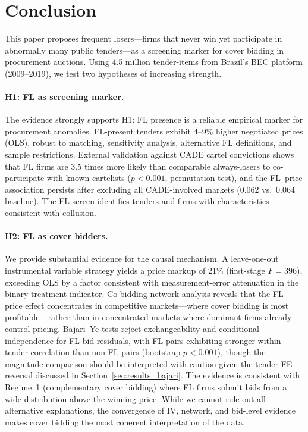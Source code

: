 \section{Conclusion}
\label{sec:conclusion}

This paper proposes frequent losers---firms that never win yet
participate in abnormally many public tenders---as a screening marker for
cover bidding in procurement auctions. Using 4.5 million tender-items
from Brazil's BEC platform (2009--2019), we test two hypotheses of
increasing strength.

\paragraph{H1: FL as screening marker.}
The evidence strongly supports H1: FL presence is a reliable empirical
marker for procurement anomalies. FL-present tenders exhibit 4--9\%
higher negotiated prices (OLS), robust to matching, sensitivity analysis,
alternative FL definitions, and sample restrictions. External validation
against CADE cartel convictions shows that FL firms are 3.5 times
more likely than comparable always-losers to co-participate with known
cartelists ($p < 0.001$, permutation test), and the FL--price
association persists after excluding all CADE-involved markets (0.062
vs.\ 0.064 baseline). The FL screen identifies tenders and firms with
characteristics consistent with collusion.

\paragraph{H2: FL as cover bidders.}
We provide substantial evidence for the causal mechanism. A leave-one-out
instrumental variable strategy yields a price markup of 21\%
(first-stage $F = 396$), exceeding OLS by a factor consistent with
measurement-error attenuation in the binary treatment indicator.
Co-bidding network analysis reveals that the FL--price effect
concentrates in competitive markets---where cover bidding is most
profitable---rather than in concentrated markets where dominant firms
already control pricing. Bajari--Ye tests reject exchangeability and
conditional independence for FL bid residuals, with FL pairs exhibiting
stronger within-tender correlation than non-FL pairs (bootstrap
$p < 0.001$), though the magnitude comparison should be interpreted
with caution given the tender FE reversal discussed in
Section~\ref{sec:results_bajari}. The evidence is consistent with Regime~1
(complementary cover bidding) where FL firms submit bids from a wide
distribution above the winning price. While we cannot rule out all alternative explanations, the convergence
of IV, network, and bid-level evidence makes cover bidding the most
coherent interpretation of the data.

